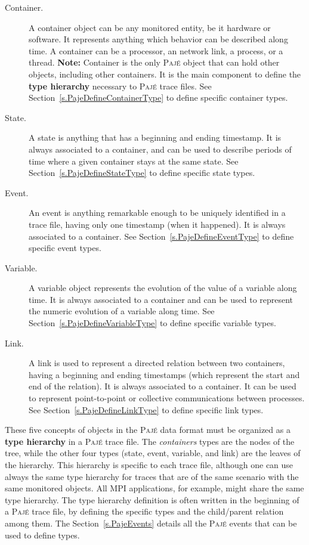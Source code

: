 \documentclass[12pt]{article}
\newcommand{\Paje}{\textsc{Paj\'e}\xspace}
\begin{document}
\begin{description}
\item [Container.] A container object can be any monitored entity, be
  it hardware or software. It represents anything which behavior can
  be described along time. A container can be a processor, an network
  link, a process, or a thread. {\bf Note:} Container is the only
  \Paje object that can hold other objects, including other
  containers. It is the main component to define the {\bf type
    hierarchy} necessary to \Paje trace files.  See
  Section~\ref{s.PajeDefineContainerType} to define specific container
  types.

\item [State.] A state is anything that has a beginning and ending
  timestamp. It is always associated to a container, and can be used
  to describe periods of time where a given container stays at the
  same state.  See Section~\ref{s.PajeDefineStateType} to define
  specific state types.

\item [Event.] An event is anything remarkable enough to be uniquely
  identified in a trace file, having only one timestamp (when it
  happened). It is always associated to a container.  See
  Section~\ref{s.PajeDefineEventType} to define specific event types.

\item [Variable.] A variable object represents the evolution of the
  value of a variable along time. It is always associated to a
  container and can be used to represent the numeric evolution of a
  variable along time. See Section~\ref{s.PajeDefineVariableType} to
  define specific variable types.

\item [Link.] A link is used to represent a directed relation between
  two containers, having a beginning and ending timestamps (which
  represent the start and end of the relation). It is always
  associated to a container. It can be used to represent
  point-to-point or collective communications between processes.  See
  Section~\ref{s.PajeDefineLinkType} to define specific link types.
\end{description}

These five concepts of objects in the \Paje data format must be
organized as a {\bf type hierarchy} in a \Paje trace file. The
\emph{containers} types are the nodes of the tree, while the other
four types (state, event, variable, and link) are the leaves of the
hierarchy. This hierarchy is specific to each trace file, although one
can use always the same type hierarchy for traces that are of the same
scenario with the same monitored objects. All MPI applications, for
example, might share the same type hierarchy. The type hierarchy
definition is often written in the beginning of a \Paje trace file, by
defining the specific types and the child/parent relation among
them. The Section~\ref{s.PajeEvents} details all the \Paje events that
can be used to define types.
\end{document}
